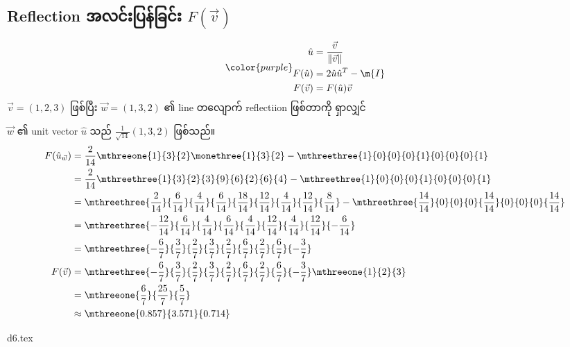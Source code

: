 \subsection{Reflection အလင်းပြန်ခြင်း $F(\vec{v})$}
\begin{equation}
    {\color{purple}\begin{split}
        \hat{u}&=\frac{\vec{v}}{\|\vec{v}\|} \\
        F(\hat{u})&=2\hat{u}\hat{u}^T-\m{I} \\
        F(\vec{v})&=F(\hat{u})\vec{v}
    \end{split}}
\end{equation}
$\vec{v}=(1,2,3)$ ဖြစ်ပြီး $\vec{w}=(1,3,2)$ ၏ line တလျောက် reflectiion ဖြစ်တာကို ရှာလျှင်

$\vec{w}$ ၏ unit vector $\hat{u}$ သည် $\frac{1}{\sqrt{14}}(1,3,2)$ ဖြစ်သည်။
\[
    \begin{split}
        F(\hat{u}_{\vec{w}})&=\frac{2}{14}\mthreeone{1}{3}{2}\monethree{1}{3}{2}-\mthreethree{1}{0}{0}{0}{1}{0}{0}{0}{1} \\
        &=\frac{2}{14}\mthreethree{1}{3}{2}{3}{9}{6}{2}{6}{4}-\mthreethree{1}{0}{0}{0}{1}{0}{0}{0}{1} \\
        &=\mthreethree{\frac{2}{14}}{\frac{6}{14}}{\frac{4}{14}}{\frac{6}{14}}{\frac{18}{14}}{\frac{12}{14}}{\frac{4}{14}}{\frac{12}{14}}{\frac{8}{14}}-\mthreethree{\frac{14}{14}}{0}{0}{0}{\frac{14}{14}}{0}{0}{0}{\frac{14}{14}} \\
        &=\mthreethree{-\frac{12}{14}}{\frac{6}{14}}{\frac{4}{14}}{\frac{6}{14}}{\frac{4}{14}}{\frac{12}{14}}{\frac{4}{14}}{\frac{12}{14}}{-\frac{6}{14}} \\
        &=\mthreethree{-\frac{6}{7}}{\frac{3}{7}}{\frac{2}{7}}{\frac{3}{7}}{\frac{2}{7}}{\frac{6}{7}}{\frac{2}{7}}{\frac{6}{7}}{-\frac{3}{7}} \\
        F(\vec{v})&=\mthreethree{-\frac{6}{7}}{\frac{3}{7}}{\frac{2}{7}}{\frac{3}{7}}{\frac{2}{7}}{\frac{6}{7}}{\frac{2}{7}}{\frac{6}{7}}{-\frac{3}{7}}\mthreeone{1}{2}{3} \\
        &=\mthreeone{\frac{6}{7}}{\frac{25}{7}}{\frac{5}{7}} \\
        &\approx\mthreeone{0.857}{3.571}{0.714}
    \end{split}
\]
\begin{center}
    {d6.tex}
\end{center}